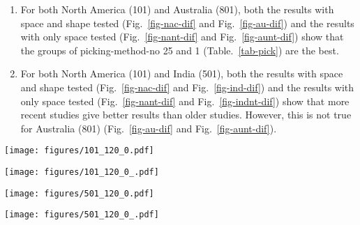\begin{enumerate}
        best; interestingly, picking-method-no 26 is one of the worst for both
        North America (101) and Australia (801).
  \item For both North America (101) and Australia (801), both the results with
        space and shape tested (Fig.~\ref{fig-nac-dif} and
        Fig.~\ref{fig-au-dif}) and the results with only space tested
        (Fig.~\ref{fig-nant-dif} and Fig.~\ref{fig-aunt-dif}) show that the
        groups of picking-method-no 25 and 1 (Table.~\ref{tab-pick}) are the
        best.
  \item For both North America (101) and India (501), both the results with
        space and shape tested (Fig.~\ref{fig-nac-dif} and
        Fig.~\ref{fig-ind-dif}) and the results with only space tested
        (Fig.~\ref{fig-nant-dif} and Fig.~\ref{fig-indnt-dif}) show that more
        recent studies give better results than older studies. However, this is
        not true for Australia (801) (Fig.~\ref{fig-au-dif} and
        Fig.~\ref{fig-aunt-dif}).
\end{enumerate}

\begin{figure*}
\centering
\texttt{[image: figures/101\_120\_0.pdf]}
\caption[Differences with test of plate 101's paleomagnetic APWPs versus its FHM
predicted APWP]{Difference values with test between North American (101)
paleomagnetic APWPs and its predicted APWP from FHM and related plate
circuit.}\label{fig-nac-dif}
\end{figure*}

\begin{figure*}
\centering
\texttt{[image: figures/101\_120\_0\_.pdf]}
\caption[Differences without shape test of plate 101's paleomagnetic APWPs
versus its FHM predicted APWP]{Difference values without shape test between
North American (101) paleomagnetic APWPs and its predicted APWP from FHM and
related plate circuit.}\label{fig-nant-dif}
\end{figure*}

\begin{figure*}
\centering
\texttt{[image: figures/501\_120\_0.pdf]}
\caption[Differences with test of plate 501's paleomagnetic APWPs versus its FHM
predicted APWP]{Difference values with test between Indian (501) paleomagnetic
APWPs and its predicted APWP from FHM and related plate
circuit.}\label{fig-ind-dif}
\end{figure*}

\begin{figure*}
\centering
\texttt{[image: figures/501\_120\_0\_.pdf]}
\caption[Differences without shape test of plate 501's paleomagnetic APWPs
versus its FHM predicted APWP]{Difference values without shape test between
Indian (501) paleomagnetic APWPs and its predicted APWP from FHM and related
plate circuit.}\label{fig-indnt-dif}
\end{figure*}

